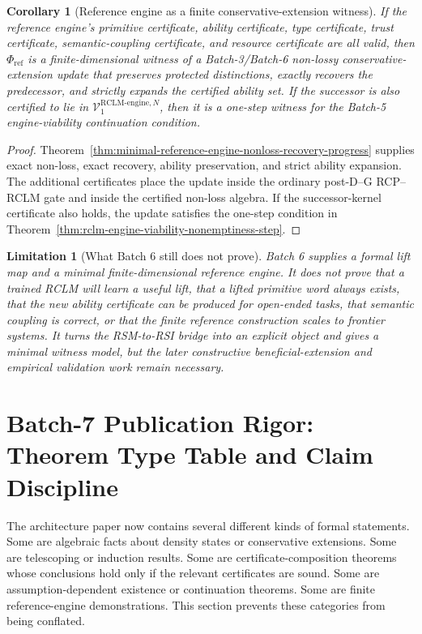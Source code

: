 \documentclass[11pt,a4paper]{article}
\newtheorem{corollary}[theorem]{Corollary}
\newtheorem{limitation}[theorem]{Limitation}
\newcommand{\Vcal}{\mathcal V}
\newcommand{\RCLM}{\mathrm{RCLM}}
\newcommand{\engine}{\mathrm{engine}}
\begin{document}
\begin{corollary}[Reference engine as a finite conservative-extension witness]
\label{cor:reference-engine-finite-witness}
If the reference engine's primitive certificate, ability certificate, type certificate, trust certificate, semantic-coupling certificate, and resource certificate are all valid, then \(\Phi_{\mathrm{ref}}\) is a finite-dimensional witness of a Batch-3/Batch-6 non-lossy conservative-extension update that preserves protected distinctions, exactly recovers the predecessor, and strictly expands the certified ability set.  If the successor is also certified to lie in \(\Vcal_1^{\RCLM\text{-}\engine,N}\), then it is a one-step witness for the Batch-5 engine-viability continuation condition.
\end{corollary}

\begin{proof}
Theorem~\ref{thm:minimal-reference-engine-nonloss-recovery-progress} supplies exact non-loss, exact recovery, ability preservation, and strict ability expansion.  The additional certificates place the update inside the ordinary post-D--G RCP--RCLM gate and inside the certified non-loss algebra.  If the successor-kernel certificate also holds, the update satisfies the one-step condition in Theorem~\ref{thm:rclm-engine-viability-nonemptiness-step}.
\end{proof}

\begin{limitation}[What Batch 6 still does not prove]
\label{lim:rclm-batch6-not-complete-engine}
Batch 6 supplies a formal lift map and a minimal finite-dimensional reference engine.  It does not prove that a trained RCLM will learn a useful lift, that a lifted primitive word always exists, that the new ability certificate can be produced for open-ended tasks, that semantic coupling is correct, or that the finite reference construction scales to frontier systems.  It turns the RSM-to-RSI bridge into an explicit object and gives a minimal witness model, but the later constructive beneficial-extension and empirical validation work remain necessary.
\end{limitation}


\section{Batch-7 Publication Rigor: Theorem Type Table and Claim Discipline}
\label{sec:batch7-theorem-types}

The architecture paper now contains several different kinds of formal statements. Some are algebraic facts about density states or conservative extensions. Some are telescoping or induction results. Some are certificate-composition theorems whose conclusions hold only if the relevant certificates are sound. Some are assumption-dependent existence or continuation theorems. Some are finite reference-engine demonstrations. This section prevents these categories from being conflated.
\end{document}

